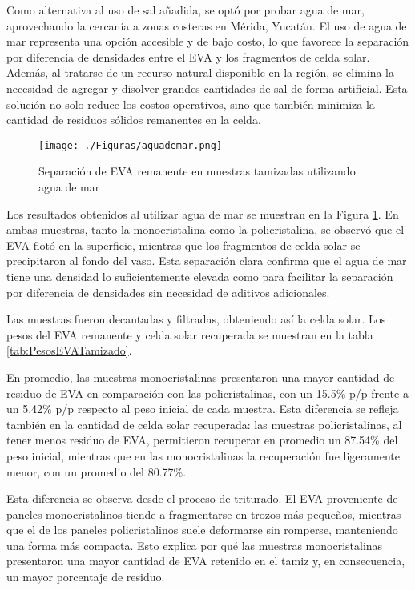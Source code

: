 Como alternativa al uso de sal añadida, se optó por probar agua de mar, aprovechando la cercanía a zonas costeras en Mérida, Yucatán. El uso de agua de mar representa una opción accesible y de bajo costo, lo que favorece la separación por diferencia de densidades entre el EVA y los fragmentos de celda solar. Además, al tratarse de un recurso natural disponible en la región, se elimina la necesidad de agregar y disolver grandes cantidades de sal de forma artificial. Esta solución no solo reduce los costos operativos, sino que también minimiza la cantidad de residuos sólidos remanentes en la celda.

\begin{figure}[htb]
	\begin{center}
		\texttt{[image: ./Figuras/aguademar.png]}
	\end{center}
	\vspace{-1em} %
	\caption{Separación de EVA remanente en muestras tamizadas utilizando agua de mar }
	\label{fig:MuestrasAguaMar}
\end{figure}

Los resultados obtenidos al utilizar agua de mar se muestran en la Figura \ref{fig:MuestrasAguaMar}. En ambas muestras, tanto la monocristalina como la policristalina, se observó que el EVA flotó en la superficie, mientras que los fragmentos de celda solar se precipitaron al fondo del vaso. Esta separación clara confirma que el agua de mar tiene una densidad lo suficientemente elevada como para facilitar la separación por diferencia de densidades sin necesidad de aditivos adicionales. 

Las muestras fueron decantadas y filtradas, obteniendo así la celda solar. Los pesos del EVA remanente y celda solar recuperada se muestran en la tabla \ref{tab:PesosEVATamizado}.

En promedio, las muestras monocristalinas presentaron una mayor cantidad de residuo de EVA en comparación con las policristalinas, con un 15.5\% p/p frente a un 5.42\% p/p respecto al peso inicial de cada muestra. Esta diferencia se refleja también en la cantidad de celda solar recuperada: las muestras policristalinas, al tener menos residuo de EVA, permitieron recuperar en promedio un 87.54\% del peso inicial, mientras que en las monocristalinas la recuperación fue ligeramente menor, con un promedio del 80.77\%.

Esta diferencia se observa desde el proceso de triturado. El EVA proveniente de paneles monocristalinos tiende a fragmentarse en trozos más pequeños, mientras que el de los paneles policristalinos suele deformarse sin romperse, manteniendo una forma más compacta. Esto explica por qué las muestras monocristalinas presentaron una mayor cantidad de EVA retenido en el tamiz y, en consecuencia, un mayor porcentaje de residuo.

